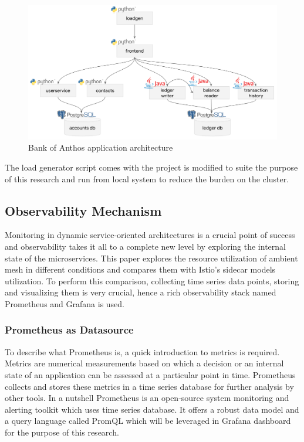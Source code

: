 \begin{figure}[ht!]
  \centering
  \includegraphics[width=1.0\linewidth]{resources/boa-architecture.png}
  \caption{Bank of Anthos application architecture}
  \label{method:boaDesign}
\end{figure}

The load generator script comes with the project is modified to suite the purpose of this research and run from local system to reduce the burden on the cluster.


\subsection{Observability Mechanism}
\label{observabilityStack}
Monitoring in dynamic service-oriented architectures is a crucial point of success and observability takes it all to a complete new level by exploring the internal state of the microservices. This paper explores the resource utilization of ambient mesh in different conditions and compares them with Istio's sidecar models utilization. To perform this comparison, collecting time series data points, storing and visualizing them is very crucial, hence a rich observability stack named Prometheus and Grafana is used.

\subsubsection{Prometheus as Datasource}
To describe what Prometheus is, a quick introduction to metrics is required. Metrics are numerical measurements based on which a decision or an internal state of an application can be assessed at a particular point in time. Prometheus collects and stores these metrics in a time series database for further analysis by other tools. In a nutshell Prometheus is an open-source system monitoring and alerting toolkit which uses time series database. It offers a robust data model and a query language called PromQL which will be leveraged in Grafana dashboard for the purpose of this research.

